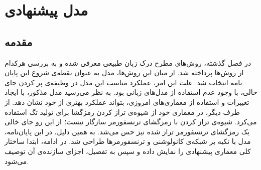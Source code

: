 \chapter{مدل پیشنهادی}
\pagebreak
\section{مقدمه}
در فصل گذشته، روش‌های مطرح درک زبان طبیعی  معرفی شده و به بررسی هرکدام از روش‌ها پرداخته شد. از میان این روش‌ها، مدل  \cite{Wang:18} به عنوان نقطه‌ی شروع این پایان نامه انتخاب شد. علت این امر، عملکرد مناسب این مدل در وظیفه‌ی پر کردن جای خالی، با وجود عدم استفاده از مدل‌های زبانی بود. به نظر می‌رسید مدل مذکور، با ایجاد تغییرات و استفاده از معماری‌های امروزی، بتواند عملکرد بهتری از خود نشان دهد. از طرف دیگر، \cite{Wang:18} در معماری خود از شیوه‌ی تراز کردن رمزگشا برای تولید تگ استفاده می‌کرد. شیوه‌ی تراز کردن  با رمزگشای ترنسفورمر سازگار نیست؛ از این رو جای خالی یک رمزگشای ترنسفورمر تراز شده نیز حس می‌شد. به همین دلیل، در این پایان‌نامه، مدل  با تکیه بر شبکه‌ی کانولوشنی و ترنسفورمرها طراحی شد. در ادامه، ابتدا ساختار کلی معماری پیشنهادی را نمایش داده و سپس به تفصیل، اجزای سازنده‌ی آن توصیف می‌شود.

